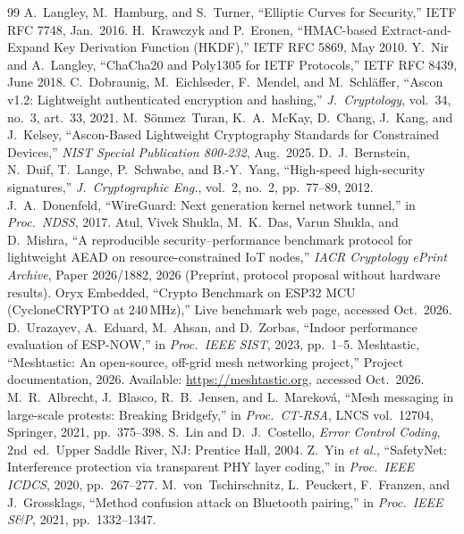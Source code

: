 \documentclass[conference]{IEEEtran}
\begin{document}
{\begin{thebibliography}{99}
 A.~Langley, M.~Hamburg, and S.~Turner, ``Elliptic Curves for Security,'' IETF RFC 7748, Jan.\ 2016.
 H.~Krawczyk and P.~Eronen, ``HMAC-based Extract-and-Expand Key Derivation Function (HKDF),'' IETF RFC 5869, May 2010.
 Y.~Nir and A.~Langley, ``ChaCha20 and Poly1305 for IETF Protocols,'' IETF RFC 8439, June 2018.
 C.~Dobraunig, M.~Eichlseder, F.~Mendel, and M.~Schl{\"a}ffer, ``Ascon v1.2: Lightweight authenticated encryption and hashing,'' \textit{J.\ Cryptology}, vol.~34, no.~3, art.~33, 2021.
 M.~S{\"o}nmez~Turan, K.~A.~McKay, D.~Chang, J.~Kang, and J.~Kelsey, ``Ascon-Based Lightweight Cryptography Standards for Constrained Devices,'' \textit{NIST Special Publication 800-232}, Aug.\ 2025.
 D.~J.~Bernstein, N.~Duif, T.~Lange, P.~Schwabe, and B.-Y.~Yang, ``High-speed high-security signatures,'' \textit{J.\ Cryptographic Eng.}, vol.~2, no.~2, pp.~77--89, 2012.
 J.~A.~Donenfeld, ``WireGuard: Next generation kernel network tunnel,'' in \textit{Proc.\ NDSS}, 2017.
 Atul, Vivek Shukla, M.~K.~Das, Varun Shukla, and D.~Mishra, ``A reproducible security--performance benchmark protocol for lightweight AEAD on resource-constrained IoT nodes,'' \textit{IACR Cryptology ePrint Archive}, Paper 2026/1882, 2026 (Preprint, protocol proposal without hardware results).
 Oryx Embedded, ``Crypto Benchmark on ESP32 MCU (CycloneCRYPTO at 240\,MHz),'' Live benchmark web page, accessed Oct.\ 2026.
 D.~Urazayev, A.~Eduard, M.~Ahsan, and D.~Zorbas, ``Indoor performance evaluation of ESP-NOW,'' in \textit{Proc.\ IEEE SIST}, 2023, pp.~1--5.
 Meshtastic, ``Meshtastic: An open-source, off-grid mesh networking project,'' Project documentation, 2026. Available: \url{https://meshtastic.org}, accessed Oct.\ 2026.
 M.~R.~Albrecht, J.~Blasco, R.~B.~Jensen, and L.~Marekov{\'a}, ``Mesh messaging in large-scale protests: Breaking Bridgefy,'' in \textit{Proc.\ CT-RSA}, LNCS vol.~12704, Springer, 2021, pp.~375--398.
 S.~Lin and D.~J.~Costello, \textit{Error Control Coding}, 2nd~ed.\ Upper Saddle River, NJ: Prentice Hall, 2004.
 Z.~Yin \textit{et al.}, ``SafetyNet: Interference protection via transparent PHY layer coding,'' in \textit{Proc.\ IEEE ICDCS}, 2020, pp.~267--277.
 M.~von~Tschirschnitz, L.~Peuckert, F.~Franzen, and J.~Grossklags, ``Method confusion attack on Bluetooth pairing,'' in \textit{Proc.\ IEEE S\&P}, 2021, pp.~1332--1347.

\end{thebibliography}}
\end{document}

